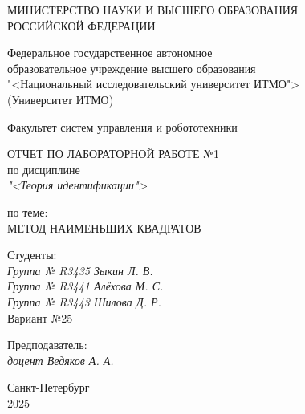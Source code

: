 \thispagestyle{empty}

\begin{center}
    МИНИСТЕРСТВО НАУКИ И ВЫСШЕГО ОБРАЗОВАНИЯ \\ РОССИЙСКОЙ ФЕДЕРАЦИИ

    \vspace{20pt}

    Федеральное государственное автономное \\ образовательное учреждение высшего образования \\
    "<Национальный исследовательский университет ИТМО"> \\
    (Университет ИТМО)

    \vspace{20pt}

    Факультет систем управления и робототехники
\end{center}

\vfill

\begin{center}
    ОТЧЕТ ПО ЛАБОРАТОРНОЙ РАБОТЕ №1\\  
    по дисциплине \\
    \textit{"<Теория идентификации">}

    \vspace{20pt}

    по теме: \\
    \uppercase{Метод наименьших квадратов}
\end{center}

\vfill

    \noindent Студенты: \\
    \textit{Группа № R3435 \hfill Зыкин Л. В.} \\
    \textit{Группа № R3441 \hfill Алёхова М. С.} \\
    \textit{Группа № R3443 \hfill Шилова Д. Р.} \\
    \noindent Вариант №25 \\
    \vspace{20pt}

    \noindent Предподаватель: \\
    \textit{доцент \hfill Ведяков А. А.}

\vfill

\begin{center}
    Санкт-Петербург \\ 2025
\end{center}